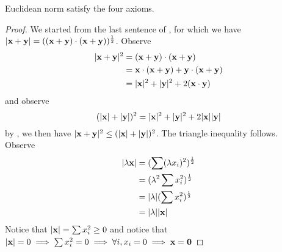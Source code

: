 \documentclass{report}
\begin{document}
\begin{theorem}
\label{1.6.5}
Euclidean norm satisfy the four axioms.
\end{theorem}
\begin{proof}
We started from the last sentence of , for which we have $|\textbf{x}+\textbf{y}|=((\textbf{x}+\textbf{y})\cdot(\textbf{x}+\textbf{y}))^{\frac{1}{2}}$. Observe
\begin{align}
|\textbf{x}+\textbf{y}|^2&=(\textbf{x}+\textbf{y})\cdot(\textbf{x}+\textbf{y})\\
&=\textbf{x}\cdot(\textbf{x}+\textbf{y})+\textbf{y}\cdot(\textbf{x}+\textbf{y})\\
&=|\textbf{x}|^2+|\textbf{y}|^2+2(\textbf{x}\cdot\textbf{y})
\end{align}
and observe
\begin{equation}
  (|\textbf{x}|+|\textbf{y}|)^2=|\textbf{x}|^2+|\textbf{y}|^2+2|\textbf{x}||\textbf{y}|
\end{equation}
by , we then have $|\textbf{x}+\textbf{y}|^2\leq (|\textbf{x}|+|\textbf{y}|)^2$. The triangle inequality follows.\\

Observe
\begin{align}
|\lambda\textbf{x}|&=(\sum (\lambda x_i)^2)^{\frac{1}{2}}\\
&=(\lambda ^2\sum x_i^2)^{\frac{1}{2}}\\
&=|\lambda |(\sum x_i^2)^{\frac{1}{2}}\\
&=|\lambda ||\textbf{x}|
\end{align}
Notice that $|\textbf{x}|=\sum x_i^2\geq 0$ and notice that $|\textbf{x}|=0\implies \sum x_i^2=0\implies \forall i,x_i=0\implies \textbf{x}=\textbf{0}$
\end{proof}
\end{document}
